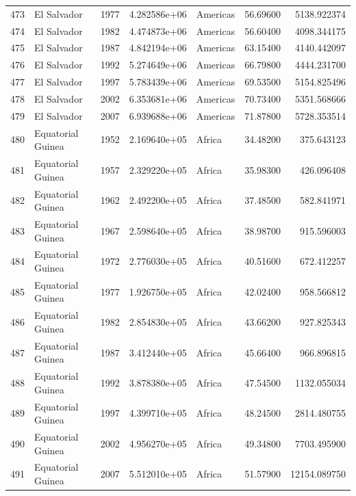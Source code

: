 \documentclass[
  letterpaper,
  DIV=11,
  numbers=noendperiod]{scrreprt}
\begin{document}
\begin{tabular}{llrrlrr}
473  &               El Salvador &  1977 &  4.282586e+06 &  Americas &  56.69600 &    5138.922374 \\
474  &               El Salvador &  1982 &  4.474873e+06 &  Americas &  56.60400 &    4098.344175 \\
475  &               El Salvador &  1987 &  4.842194e+06 &  Americas &  63.15400 &    4140.442097 \\
476  &               El Salvador &  1992 &  5.274649e+06 &  Americas &  66.79800 &    4444.231700 \\
477  &               El Salvador &  1997 &  5.783439e+06 &  Americas &  69.53500 &    5154.825496 \\
478  &               El Salvador &  2002 &  6.353681e+06 &  Americas &  70.73400 &    5351.568666 \\
479  &               El Salvador &  2007 &  6.939688e+06 &  Americas &  71.87800 &    5728.353514 \\
480  &         Equatorial Guinea &  1952 &  2.169640e+05 &    Africa &  34.48200 &     375.643123 \\
481  &         Equatorial Guinea &  1957 &  2.329220e+05 &    Africa &  35.98300 &     426.096408 \\
482  &         Equatorial Guinea &  1962 &  2.492200e+05 &    Africa &  37.48500 &     582.841971 \\
483  &         Equatorial Guinea &  1967 &  2.598640e+05 &    Africa &  38.98700 &     915.596003 \\
484  &         Equatorial Guinea &  1972 &  2.776030e+05 &    Africa &  40.51600 &     672.412257 \\
485  &         Equatorial Guinea &  1977 &  1.926750e+05 &    Africa &  42.02400 &     958.566812 \\
486  &         Equatorial Guinea &  1982 &  2.854830e+05 &    Africa &  43.66200 &     927.825343 \\
487  &         Equatorial Guinea &  1987 &  3.412440e+05 &    Africa &  45.66400 &     966.896815 \\
488  &         Equatorial Guinea &  1992 &  3.878380e+05 &    Africa &  47.54500 &    1132.055034 \\
489  &         Equatorial Guinea &  1997 &  4.399710e+05 &    Africa &  48.24500 &    2814.480755 \\
490  &         Equatorial Guinea &  2002 &  4.956270e+05 &    Africa &  49.34800 &    7703.495900 \\
491  &         Equatorial Guinea &  2007 &  5.512010e+05 &    Africa &  51.57900 &   12154.089750 \\

\end{tabular}
\end{document}
